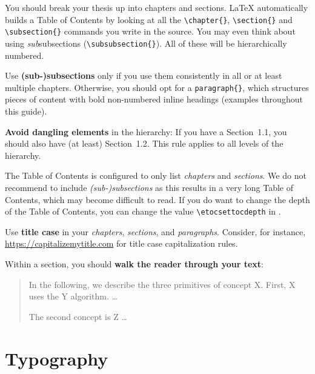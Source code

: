 You should break your thesis up into chapters and sections. LaTeX automatically builds a Table of Contents by looking at all the \verb|\chapter{}|, \verb|\section{}|  and \verb|\subsection{}| commands you write in the source. You may even think about using \emph{sub}subsections (\verb|\subsubsection{}|). All of these will be hierarchically numbered.

Use \textbf{(sub-)subsections} only if you use them consistently in all or at least multiple chapters. Otherwise, you should opt for a \verb|paragraph{}|, which structures pieces of content with bold non-numbered inline headings (examples throughout this guide).

\textbf{Avoid dangling elements} in the hierarchy: If you have a Section~1.1, you should also have (at least) Section~1.2. This rule applies to all levels of the hierarchy.

The Table of Contents is configured to only list \emph{chapters} and \emph{sections}. We do not recommend to include \emph{(sub-)subsections} as this results in a very long Table of Contents, which may become difficult to read. If you do want to change the depth of the Table of Contents, you can change the value \verb|\etocsettocdepth| in .

Use \textbf{title case} in your \emph{chapters}, \emph{sections}, and \emph{paragraphs}. Consider, for instance, \url{https://capitalizemytitle.com} for title case capitalization rules.

Within a section, you should \textbf{walk the reader through your text}:
\begin{quote}
In the following, we describe the three primitives of concept X. First, X uses the Y algorithm. …

The second concept is Z …
\end{quote}

\section{Typography}

